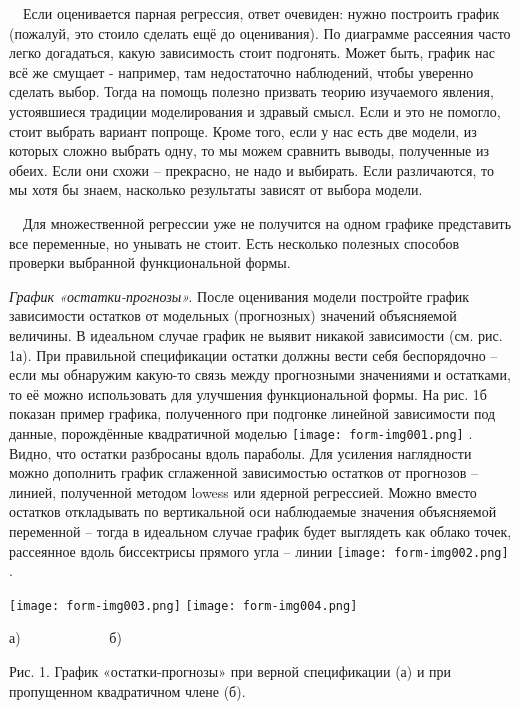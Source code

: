 \documentclass[a4paper]{article}
\begin{document}
\ \ Если оценивается парная регрессия, ответ очевиден: нужно построить график (пожалуй, это стоило сделать ещё до оценивания). По диаграмме рассеяния часто легко догадаться, какую зависимость стоит подгонять. Может быть, график нас всё же смущает - например, там недостаточно наблюдений, чтобы уверенно сделать выбор. Тогда на помощь полезно призвать теорию изучаемого явления, устоявшиеся традиции моделирования и здравый смысл. Если и это не помогло, стоит выбрать вариант попроще. Кроме того, если у нас есть две модели, из которых сложно выбрать одну, то мы можем сравнить выводы, полученные из обеих. Если они схожи – прекрасно, не надо и выбирать. Если различаются, то мы хотя бы знаем, насколько результаты зависят от выбора модели.

\ \ Для множественной регрессии уже не получится на одном графике представить все переменные, но унывать не стоит. Есть несколько полезных способов проверки выбранной функциональной формы.

\textit{График «остатки-прогнозы».} После оценивания модели постройте график зависимости остатков от модельных (прогнозных) значений объясняемой величины. В идеальном случае график не выявит никакой зависимости (см. рис. 1а). При правильной спецификации остатки должны вести себя беспорядочно – если мы обнаружим какую-то связь между прогнозными значениями и остатками, то её можно использовать для улучшения функциональной формы. На рис. 1б показан пример графика, полученного при подгонке линейной зависимости под данные, порождённые квадратичной моделью  \texttt{[image: form-img001.png]} . Видно, что остатки разбросаны вдоль параболы. Для усиления наглядности можно дополнить график сглаженной зависимостью остатков от прогнозов – линией, полученной методом lowess или ядерной регрессией. Можно вместо остатков откладывать по вертикальной оси наблюдаемые значения объясняемой переменной – тогда в идеальном случае график будет выглядеть как облако точек, рассеянное вдоль биссектрисы прямого угла – линии  \texttt{[image: form-img002.png]} .

 \texttt{[image: form-img003.png]}  \texttt{[image: form-img004.png]} 

{\centering
а) \ \ \ \ \ \ \ \ \ \ \ \ б)
\par}

{\centering
Рис. 1. График «остатки-прогнозы» при верной спецификации (а) и при пропущенном квадратичном члене (б).
\par}
\end{document}
